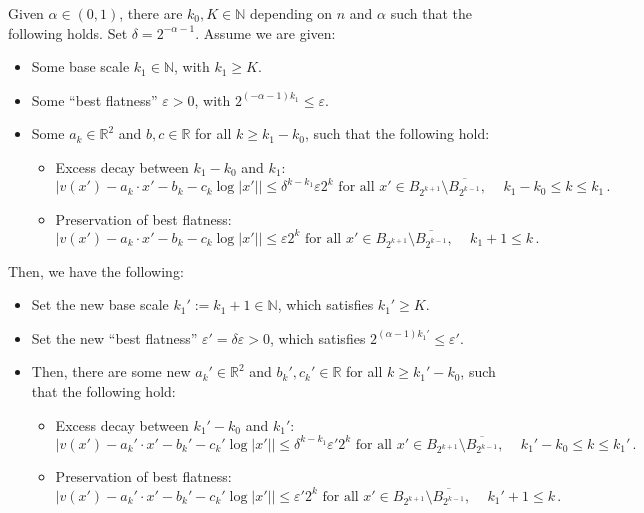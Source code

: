 \documentclass[10pt,a4paper]{amsart}
\newcommand{\N}{\mathbb{N}}
\newcommand{\R}{\mathbb{R}}
\newcommand{\ep}{\varepsilon}
\begin{document}
\begin{proposition}\label{prop:mainiterationB}
    Given $\alpha\in(0,1)$, there are $k_0,K\in\N$ depending on $n$ and $\alpha$ such that the following holds. Set $\delta=2^{-\alpha-1}$. Assume we are given:
    \begin{itemize}
        \item Some base scale $k_1\in\N$, with $k_1\geq K$.
        \item Some ``best flatness'' $\ep>0$, with $2^{(-\alpha-1) k_1}\leq \ep$.
        \item Some $a_k\in \R^2$ and $b,c\in\R$ for all $k\geq k_1-k_0$, such that the following hold:
\begin{itemize}
    \item Excess decay between $k_1-k_0$ and $k_1$:
    $$|v(x')-a_k\cdot x'-b_k-c_k\log|x'||\leq \delta^{k-k_1}\ep 2^{k} \mbox{ for all } x'\in B_{2^{k+1}}\setminus \overline{B_{2^{k-1}}},\,\quad k_1-k_0\leq k \leq k_1\,.$$
    \item Preservation of best flatness: $$|v(x')-a_k\cdot x'-b_k-c_k\log|x'||\leq \ep 2^{k} \mbox{ for all } x'\in B_{2^{k+1}}\setminus \overline{B_{2^{k-1}}},\,\quad k_1+1\leq k \,.$$
\end{itemize}
    \end{itemize}
Then, we have the following:
    \begin{itemize}
        \item Set the new base scale $k_1':=k_1+1\in\N$, which satisfies $k_1'\geq K$.
        \item Set the new ``best flatness'' $\ep'=\delta\ep>0$, which satisfies $2^{(\alpha-1) k_1'}\leq \ep'$.
        \item Then, there are some new $a_k'\in \R^2$ and $b_k',c_k'\in\R$ for all $k\geq k_1'-k_0$, such that the following hold:
\begin{itemize}
    \item Excess decay between $k_1'-k_0$ and $k_1'$:
    $$|v(x')-a_k'\cdot x'-b_k'-c_k'\log|x'||\leq \delta^{k-k_1}\ep' 2^{k} \mbox{ for all } x'\in B_{2^{k+1}}\setminus \overline{B_{2^{k-1}}},\,\quad k_1'-k_0\leq k \leq k_1'\,.$$
    \item Preservation of best flatness: $$|v(x')-a_k'\cdot x'-b_k'-c_k'\log|x'||\leq \ep' 2^{k} \mbox{ for all } x'\in B_{2^{k+1}}\setminus \overline{B_{2^{k-1}}},\,\quad k_1'+1\leq k \,.$$
\end{itemize}
    \end{itemize}
\end{proposition}
\end{document}
